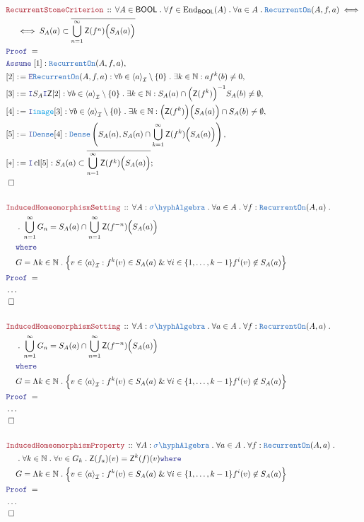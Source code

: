 \documentclass[12pt]{scrartcl}
\newcommand{\TYPE}[1]{\textcolor{NavyBlue}{\mathtt{#1}}}
\newcommand{\FUNC}[1]{\textcolor{Cerulean}{\mathtt{#1}}}
\newcommand{\LOGIC}[1]{\textcolor{Blue}{\mathtt{#1}}}
\newcommand{\THM}[1]{\textcolor{Maroon}{\mathtt{#1}}}
\renewcommand{\.}{\; . \;}
\newcommand{\de}{: \kern 0.1pc =}
\newcommand{\where}{\LOGIC{where}}
\newcommand{\Theorem}[2]{& \THM{#1} \, :: \, #2 \\ & \Proof = \\ }
\newcommand{\NewLine}{\\ & \kern 1pc}
\newcommand{\Page}[1]{ \begin{align*} #1 \end{align*}   }
\newcommand{\NoProof}{ & \ldots \\ \EndProof}
\renewcommand{\And}{\; \& \;}
\newcommand{\Intro}{\LOGIC{I}}
\newcommand{\Elim}{\LOGIC{E}}
\newcommand{\Nat}{\mathbb{N} }
\newcommand{\End}{\mathrm{End}}
\newcommand{\Say}[3]{& #1 \de #2 : #3, \\}
\newcommand{\Conclude}[3]{& #1 \de #2 : #3; \\}
\newcommand{\Assume}[2]{& \LOGIC{Assume} \; #1 : #2, \\}
\newcommand{\QED}{\; \square}
\newcommand{\EndProof}{& \QED \\}
\newcommand{\Proof}{\LOGIC{Proof} \; }
\newcommand{\SA}{\TYPE{\sigma \hyph Algebra}}
\newcommand{\genIdeal}[1]{\left\langle #1 \right\rangle_\mathcal{I}}
\newcommand{\Dense}{\TYPE{Dense}}
\DeclareMathOperator*{\cl}{cl}
\newcommand{\BOOL}{\mathsf{BOOL}}
\newcommand{\Z}{\mathsf{Z}}
\begin{document}
\Page{
	\Theorem{RecurrentStoneCriterion}
	{
		\forall A \in \BOOL \.
		\forall f \in \End_\BOOL(A) \.
		\forall a \in A \.
		\TYPE{RecurrentOn}(A,f,a) 
		\iff
		\NewLine 
		\iff
		S_A(a) \subset \overline{\bigcup_{n=1}^\infty \Z(f^n)\Big(S_A(a)\Big)}
	}
	\Assume{[1]}{\TYPE{RecurrentOn}(A,f,a)}
	\Say{[2]}{\Elim \TYPE{RecurrentOn}(A,f,a)}
	{
		\forall b \in \genIdeal{a} \setminus \{0\} \.
		\exists k \in \Nat :
		a f^k(b) \neq 0
	}
	\Say{[3]}{\Intro S_A \Intro \Z [2]}
	{
		\forall b \in \genIdeal{a} \setminus \{0\} \.
		\exists k \in \Nat :
		S_A(a) \cap \Big( \Z(f^k) \Big)^{-1}S_A(b) \neq \emptyset
	}
	\Say{[4]}{\Intro \FUNC{image} [3]}
	{
		\forall b \in \genIdeal{a} \setminus \{0\} \.
		\exists k \in \Nat :
		\Big( \Z(f^k) \Big)\Big(S_A(a)\Big) \cap S_A(b) \neq \emptyset
	}
	\Say{[5]}
	{
		\Intro \Dense [4]
	}
	{
		\Dense
		\left( S_A(a),   
			S_A(a) \cap \bigcup^\infty_{k=1} \Z(f^k)\Big(S_A(a)\Big)   
		\right)
	}
	\Conclude{[*]}{\Intro \cl [5]}
	{
		S_A(a) \subset \overline{\bigcup^\infty_{n=1} \Z(f^k)\Big(S_A(a)\Big) }
	}
	\EndProof
	\\
	\Theorem{InducedHomeomorphismSetting}{
		\forall A : \SA \.
		\forall a \in A \.
		\forall f : \TYPE{RecurrentOn}(A,a) \. \NewLine \.
		\bigcup_{n=1}^\infty G_n =
		S_A(a) \cap \bigcup^\infty_{n=1} \Z(f^{-n})\Big( S_A(a) \Big)	\NewLine
		\where \NewLine
		G = \Lambda k \in \Nat \.
		\Big\{
			v \in \genIdeal{a} :
			f^k(v) \in S_A(a)   \And
			\forall i \in \{1,\ldots,k-1\}
			f^i(v) \not \in S_A(a)  
		\Big\}	
	}
	\NoProof
	\\
	\Theorem{InducedHomeomorphismSetting}{
		\forall A : \SA \.
		\forall a \in A \.
		\forall f : \TYPE{RecurrentOn}(A,a) \. \NewLine \.
		\bigcup_{n=1}^\infty G_n =
		S_A(a) \cap \bigcup^\infty_{n=1} \Z(f^{-n})\Big( S_A(a) \Big)	\NewLine
		\where \NewLine
		G = \Lambda k \in \Nat \.
		\Big\{
			v \in \genIdeal{a} :
			f^k(v) \in S_A(a)   \And
			\forall i \in \{1,\ldots,k-1\}
			f^i(v) \not \in S_A(a)  
		\Big\}	
	}
	\NoProof
	\\
	\Theorem{InducedHomeomorphismProperty}{
		\forall A : \SA \.
		\forall a \in A \.
		\forall f : \TYPE{RecurrentOn}(A,a) \. \NewLine \.
		\forall k \in \Nat \.
		\forall v \in G_k \.
		\Z(f_a)(v) = \Z^k(f)(v)
		\where \NewLine
		G = \Lambda k \in \Nat \.
		\Big\{
			v \in \genIdeal{a} :
			f^k(v) \in S_A(a)   \And
			\forall i \in \{1,\ldots,k-1\}
			f^i(v) \not \in S_A(a)  
		\Big\}	
	}
	\NoProof
}
\newpage
\end{document}
